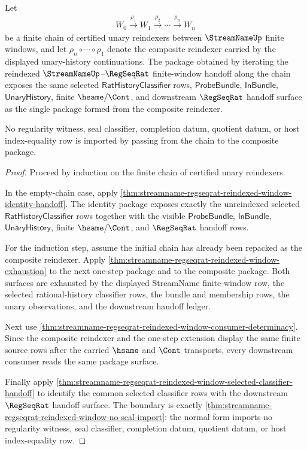 \begin{theorem}
\label{thm:streamname-regseqrat-reindexed-window-composition-normal-form}
Let
$$
\begin{gathered}
W_0 \xrightarrow{\rho_1} W_1 \xrightarrow{\rho_2} \cdots
\xrightarrow{\rho_n} W_n
\end{gathered}
$$
be a finite chain of certified unary reindexers between $\StreamNameUp$ finite
windows, and let $\rho_n\circ\cdots\circ\rho_1$ denote the composite reindexer
carried by the displayed unary-history continuations. The package obtained by
iterating the reindexed $\StreamNameUp$--$\RegSeqRat$ finite-window handoff along
the chain exposes the same selected $\mathsf{RatHistoryClassifier}$ rows,
$\mathsf{ProbeBundle}$, $\mathsf{InBundle}$, $\mathsf{UnaryHistory}$, finite
$\hsame/\Cont$, and downstream $\RegSeqRat$ handoff surface as the single
package formed from the composite reindexer.

No regularity witness, seal classifier, completion datum, quotient datum, or
host index-equality row is imported by passing from the chain to the composite
package.
\end{theorem}
\begin{proof}
Proceed by induction on the finite chain of certified unary reindexers.

In the empty-chain case, apply
\autoref{thm:streamname-regseqrat-reindexed-window-identity-handoff}. The
identity package exposes exactly the unreindexed selected
$\mathsf{RatHistoryClassifier}$ rows together with the visible
$\mathsf{ProbeBundle}$, $\mathsf{InBundle}$, $\mathsf{UnaryHistory}$, finite
$\hsame/\Cont$, and $\RegSeqRat$ handoff rows.

For the induction step, assume the initial chain has already been repacked as
the composite reindexer. Apply
\autoref{thm:streamname-regseqrat-reindexed-window-exhaustion} to the next
one-step package and to the composite package. Both surfaces are exhausted by
the displayed StreamName finite-window row, the selected rational-history
classifier rows, the bundle and membership rows, the unary observations, and the
downstream handoff ledger.

Next use
\autoref{thm:streamname-regseqrat-reindexed-window-consumer-determinacy}. Since
the composite reindexer and the one-step extension display the same finite
source rows after the carried $\hsame$ and $\Cont$ transports, every downstream
consumer reads the same package surface.

Finally apply
\autoref{thm:streamname-regseqrat-reindexed-window-selected-classifier-handoff}
to identify the common selected classifier rows with the downstream
$\RegSeqRat$ handoff surface. The boundary is exactly
\autoref{thm:streamname-regseqrat-reindexed-window-no-seal-import}: the normal
form imports no regularity witness, seal classifier, completion datum, quotient
datum, or host index-equality row.
\end{proof}

